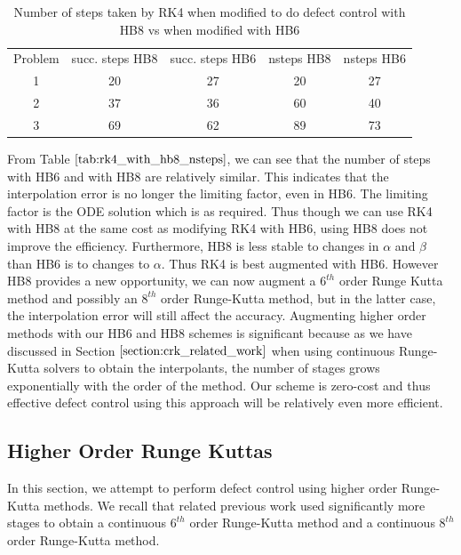 \documentclass{article}
\begin{document}
\begin{table}[h]
\caption {Number of steps taken by RK4 when modified to do defect control with HB8 vs when modified with HB6} \label{tab:rk4_with_hb8_nsteps}
\begin{center}
\begin{tabular}{ c c c c c } 
Problem & succ. steps HB8 & succ. steps HB6 & nsteps HB8 & nsteps HB6 \\ 
1       & 20                 &        27          & 20         & 27\\ 
2       & 37                 &        36          & 60         & 40\\
3       & 69                 &        62          & 89         & 73\\
\end{tabular}
\end{center}
\end{table}

From Table $\ref{tab:rk4_with_hb8_nsteps}$, we can see that the number of steps with HB6 and with HB8 are relatively similar. This indicates that the interpolation error is no longer the limiting factor, even in HB6. The limiting factor is the ODE solution which is as required. Thus though we can use RK4 with HB8 at the same cost as modifying RK4 with HB6, using HB8 does not improve the efficiency. Furthermore, HB8 is less stable to changes in $\alpha$ and $\beta$ than HB6 is to changes to $\alpha$. Thus RK4 is best augmented with HB6. However HB8 provides a new opportunity, we can now augment a $6^{th}$ order Runge Kutta method and possibly an $8^{th}$ order Runge-Kutta method, but in the latter case, the interpolation error will still affect the accuracy. Augmenting higher order methods with our HB6 and HB8 schemes is significant because as we have discussed in Section $\ref{section:crk_related_work}$ when using continuous Runge-Kutta solvers to obtain the interpolants, the number of stages grows exponentially with the order of the method. Our scheme is zero-cost and thus effective defect control using this approach will be relatively even more efficient.


\subsection{Higher Order Runge Kuttas}
\label{section:HBs_and_higher_order_RK}
In this section, we attempt to perform defect control using higher order Runge-Kutta methods. We recall that related previous work used significantly more stages to obtain a continuous $6^{th}$ order Runge-Kutta method and a continuous $8^{th}$ order Runge-Kutta method.
\end{document}

